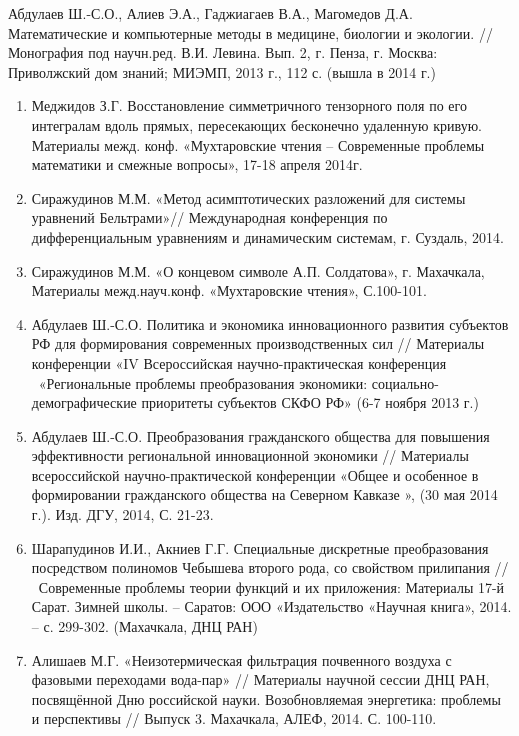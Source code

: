 \documentclass{article}
\begin{document}
\noindent Абдулаев Ш.-С.О., Алиев Э.А., Гаджиагаев В.А., Магомедов Д.А. Математические и компьютерные методы в медицине, биологии и экологии. // Монография под научн.ред. В.И. Левина. Вып. 2, г. Пенза, г. Москва: Приволжский дом знаний; МИЭМП, 2013 г., 112 с. (вышла в 2014 г.) \eject

\begin{enumerate}
\item  Меджидов З.Г. Восстановление симметричного тензорного поля по его интегралам вдоль прямых, пересекающих бесконечно удаленную кривую. Материалы межд. конф. «Мухтаровские чтения -- Современные проблемы математики и смежные вопросы», 17-18 апреля 2014г.

\item  Сиражудинов М.М. «Метод асимптотических разложений для системы уравнений Бельтрами»// Международная конференция по дифференциальным уравнениям  и динамическим системам, г. Суздаль, 2014.

\item  Сиражудинов М.М. «О концевом символе А.П. Солдатова», г. Махачкала, Материалы межд.науч.конф. «Мухтаровские чтения», С.100-101.

\item  Абдулаев Ш.-С.О. Политика и экономика инновационного развития субъектов РФ для формирования современных производственных сил // Материалы конференции «IV Всероссийская научно-практическая конференция ~«Региональные проблемы преобразования экономики: социально-демографические приоритеты субъектов СКФО РФ» (6-7 ноября 2013 г.)

\item  Абдулаев Ш.-С.О. Преобразования гражданского общества для повышения эффективности региональной инновационной экономики // Материалы всероссийской научно-практической конференции «Общее и особенное в формировании гражданского общества на Северном Кавказе », (30 мая 2014 г.). Изд. ДГУ, 2014, С. 21-23.

\item  Шарапудинов И.И., Акниев Г.Г. Специальные дискретные преобразования посредством полиномов Чебышева второго рода, со свойством прилипания // ~Современные проблемы теории функций и их приложения: Материалы 17-й Сарат. Зимней школы. -- Саратов: ООО «Издательство «Научная книга», 2014. -- с. 299-302. (Махачкала, ДНЦ РАН)

\item  Алишаев М.Г. «Неизотермическая фильтрация почвенного воздуха с фазовыми переходами вода-пар» // Материалы научной сессии ДНЦ РАН, посвящённой Дню российской науки. Возобновляемая энергетика: проблемы и перспективы // Выпуск 3. Махачкала, АЛЕФ, 2014. С. 100-110.


\end{enumerate}
\end{document}
